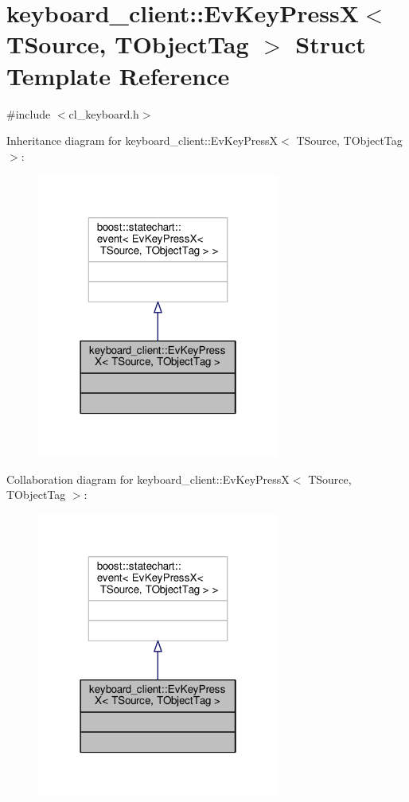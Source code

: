 \hypertarget{structkeyboard__client_1_1EvKeyPressX}{}\section{keyboard\+\_\+client\+:\+:Ev\+Key\+PressX$<$ T\+Source, T\+Object\+Tag $>$ Struct Template Reference}
\label{structkeyboard__client_1_1EvKeyPressX}


{\ttfamily \#include $<$cl\+\_\+keyboard.\+h$>$}



Inheritance diagram for keyboard\+\_\+client\+:\+:Ev\+Key\+PressX$<$ T\+Source, T\+Object\+Tag $>$\+:\nopagebreak
\begin{figure}[H]
\begin{center}
\leavevmode
\includegraphics[width=226pt]{structkeyboard__client_1_1EvKeyPressX__inherit__graph}
\end{center}
\end{figure}


Collaboration diagram for keyboard\+\_\+client\+:\+:Ev\+Key\+PressX$<$ T\+Source, T\+Object\+Tag $>$\+:\nopagebreak
\begin{figure}[H]
\begin{center}
\leavevmode
\includegraphics[width=226pt]{structkeyboard__client_1_1EvKeyPressX__coll__graph}
\end{center}
\end{figure}


